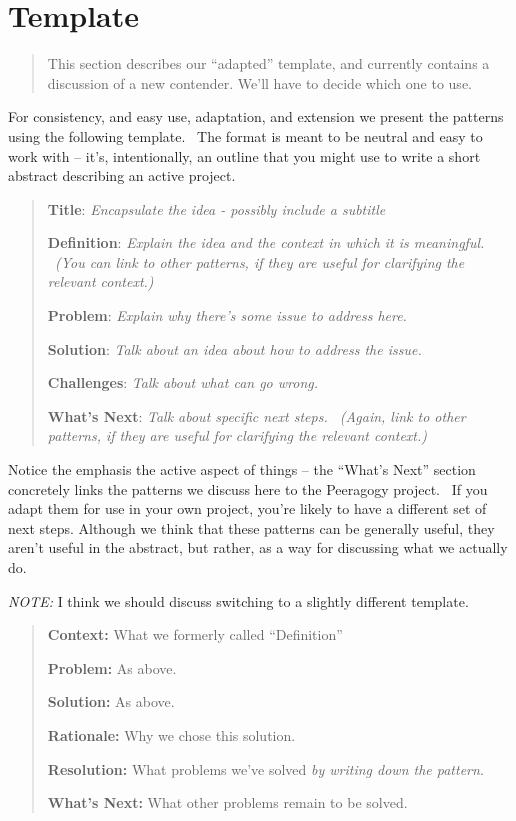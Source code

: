 \section{Template}

\begin{quote}
This section describes our ``adapted'' template, and currently contains a discussion of a new contender.  We'll have to decide which one to use.
\end{quote}

For consistency, and easy use, adaptation, and extension we present
the patterns using the following template.~ The format is meant to be
neutral and easy to work with -- it's, intentionally, an outline that
you might use to write a short abstract describing an active project.

\begin{quote}
\textbf{Title}: \emph{Encapsulate the idea - possibly include a
subtitle}

\textbf{Definition}: \emph{Explain the idea and the context in which it
is meaningful. ~(You can link to other patterns, if they are useful for
clarifying the relevant context.)}

\textbf{Problem}: \emph{Explain why there's some issue to address here.}

\textbf{Solution}: \emph{Talk about an idea about how to address the
issue.}

\textbf{Challenges}: \emph{Talk about what can go wrong.}

\textbf{What's Next}: \emph{Talk about specific next steps. ~(Again,
link to other patterns, if they are useful for clarifying the relevant
context.)}
\end{quote}

Notice the emphasis the active aspect of things -- the ``What's Next''
section concretely links the patterns we discuss here to the Peeragogy
project.~ If you adapt them for use in your own project, you're likely
to have a different set of next steps. Although we think that these
patterns can be generally useful, they aren't useful in the abstract,
but rather, as a way for discussing what we actually do.

\emph{NOTE:} I think we should discuss switching to a slightly
different template.

\begin{quote}
\textbf{Context:} What we formerly called ``Definition''

\textbf{Problem:} As above.

\textbf{Solution:} As above.

\textbf{Rationale:} Why we chose this solution.

\textbf{Resolution:} What problems we've solved \emph{by writing down the pattern}.

\textbf{What's Next:} What other problems remain to be solved.
\end{quote}
